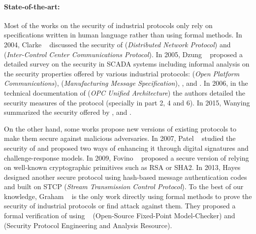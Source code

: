 \paragraph{State-of-the-art:}\label{sec:intro_sota}

Most of the works on the security of industrial protocols only rely on
specifications written in human language rather than using formal
methods.  In 2004, Clarke \etal~\cite{CR04} discussed the security
of \dnp (\emph{Distributed Network Protocol}) and \iccp
(\emph{Inter-Control Center Communications Protocol}).  In 2005,
Dzung \etal~\cite{DNHC05} proposed a detailed survey on the security
in SCADA systems including informal analysis on the security
properties offered by various industrial protocols: \opc (\emph{Open
Platform Communications}),
\mms (\emph{Manufacturing Message Specification}),
, \iccp and \etherip.
In 2006, in the technical documentation of \opcua (\emph{OPC Unified
Architecture}) the authors detailed the security measures of the
protocol (specially in part 2, 4 and 6).  In 2015, Wanying \etal
summarized the security offered by \modbus, \dnp and
\opcua.

On the other hand, some works propose new versions of existing protocols to make
them secure against malicious adversaries.
In 2007, Patel \etal~\cite{PY07} studied the security of \dnp and proposed two
ways of enhancing it through digital signatures and challenge-response models.
In 2009, Fovino \etal~\cite{FCMT09} proposed a secure version of \modbus
relying on well-known cryptographic primitives such as RSA or SHA2.
In 2013, Hayes \etal~\cite{HE13} designed another secure \modbus
protocol using hash-based message authentication codes and built on
STCP (\emph{Stream Transmission Control Protocol}).
%
To the best of our knowledge, Graham \etal~\cite{GP05} is the only
work directly using formal methods to prove the security of industrial
protocols or find attack against them.  They proposed a formal
verification of \dnp using \ofmc~\cite{BMV03} (Open-Source Fixed-Point
Model-Checker) and
\spear~\cite{SH01} (Security Protocol Engineering and Analysis Resource).


